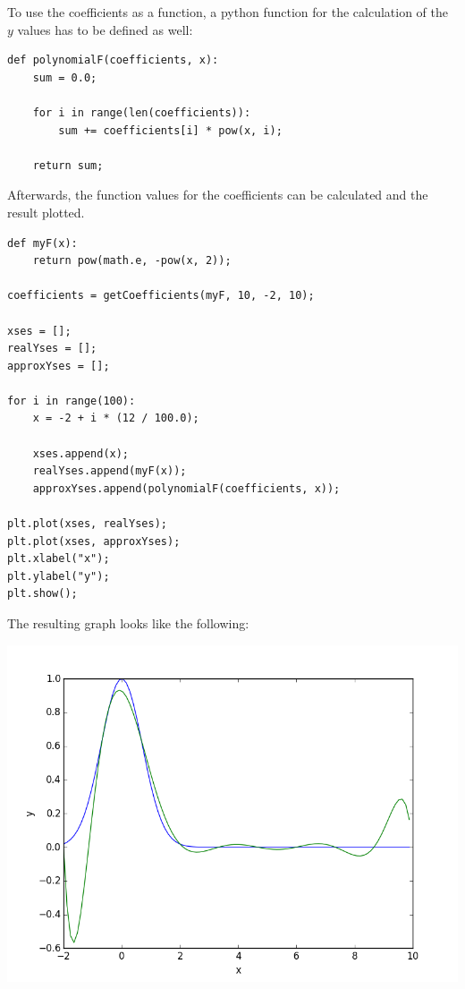 To use the coefficients as a function, a python function for the calculation of the $y$ values has to be defined as well:

\begin{lstlisting}[caption=Function which uses the calculated coefficients]
def polynomialF(coefficients, x):
	sum = 0.0;
	
	for i in range(len(coefficients)):
		sum += coefficients[i] * pow(x, i);
	
	return sum;
\end{lstlisting}

Afterwards, the function values for the coefficients can be calculated and the result plotted.

\begin{lstlisting}[caption=Problem 5.9 b)]
def myF(x):
	return pow(math.e, -pow(x, 2));

coefficients = getCoefficients(myF, 10, -2, 10);

xses = [];
realYses = [];
approxYses = [];

for i in range(100):
	x = -2 + i * (12 / 100.0);
	
	xses.append(x);
	realYses.append(myF(x));
	approxYses.append(polynomialF(coefficients, x));

plt.plot(xses, realYses);
plt.plot(xses, approxYses);
plt.xlabel("x");
plt.ylabel("y");
plt.show();
\end{lstlisting}

The resulting graph looks like the following:

\includegraphics[width=1\textwidth]{chapters/images/figure-5-9-b}

